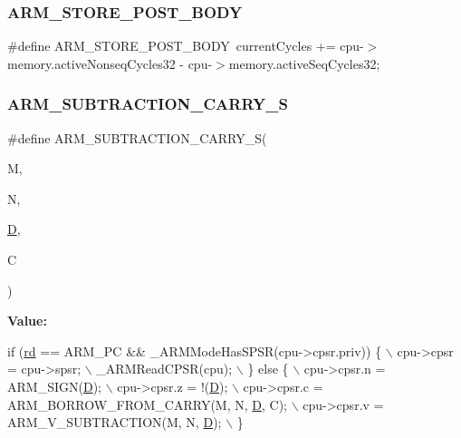 \subsubsection{\texorpdfstring{A\+R\+M\+\_\+\+S\+T\+O\+R\+E\+\_\+\+P\+O\+S\+T\+\_\+\+B\+O\+DY}{ARM\_STORE\_POST\_BODY}}
{\footnotesize\ttfamily \#define A\+R\+M\+\_\+\+S\+T\+O\+R\+E\+\_\+\+P\+O\+S\+T\+\_\+\+B\+O\+DY~current\+Cycles += cpu-\/$>$memory.\+active\+Nonseq\+Cycles32 -\/ cpu-\/$>$memory.\+active\+Seq\+Cycles32;}

\mbox{\label{isa-arm_8c_aee4a24becc54a3d3a1a570c70ec4566e}} 
\subsubsection{\texorpdfstring{A\+R\+M\+\_\+\+S\+U\+B\+T\+R\+A\+C\+T\+I\+O\+N\+\_\+\+C\+A\+R\+R\+Y\+\_\+S}{ARM\_SUBTRACTION\_CARRY\_S}}
{\footnotesize\ttfamily \#define A\+R\+M\+\_\+\+S\+U\+B\+T\+R\+A\+C\+T\+I\+O\+N\+\_\+\+C\+A\+R\+R\+Y\+\_\+S(\begin{DoxyParamCaption}\item[{}]{M,  }\item[{}]{N,  }\item[{}]{\mbox{\hyperlink{_aes_8c_adef282f11138cda3d081cc21280a8d12}{D}},  }\item[{}]{C }\end{DoxyParamCaption})}

{\bfseries Value\+:}
\begin{DoxyCode}
\textcolor{keywordflow}{if} (\mbox{\hyperlink{isa-arm_8c_a555541ce18ed9b5fad657a06b22cb465}{rd}} == ARM\_PC && \_ARMModeHasSPSR(cpu->cpsr.priv)) \{ \(\backslash\)
        cpu->cpsr = cpu->spsr; \(\backslash\)
        \_ARMReadCPSR(cpu); \(\backslash\)
    \} \textcolor{keywordflow}{else} \{ \(\backslash\)
        cpu->cpsr.n = ARM\_SIGN(\mbox{\hyperlink{_aes_8c_adef282f11138cda3d081cc21280a8d12}{D}}); \(\backslash\)
        cpu->cpsr.z = !(\mbox{\hyperlink{_aes_8c_adef282f11138cda3d081cc21280a8d12}{D}}); \(\backslash\)
        cpu->cpsr.c = ARM\_BORROW\_FROM\_CARRY(M, N, \mbox{\hyperlink{_aes_8c_adef282f11138cda3d081cc21280a8d12}{D}}, C); \(\backslash\)
        cpu->cpsr.v = ARM\_V\_SUBTRACTION(M, N, \mbox{\hyperlink{_aes_8c_adef282f11138cda3d081cc21280a8d12}{D}}); \(\backslash\)
    \}
\end{DoxyCode}
\mbox{\label{isa-arm_8c_a9f23bfbdae46505fe3d490d8dc82cd2b}} 
